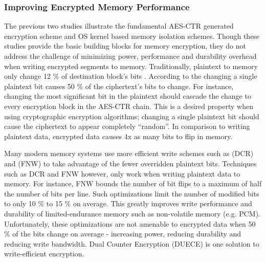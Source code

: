 \subsubsection{Improving Encrypted Memory Performance}
The previous two studies \cite{suh-memIntEnc} \cite{aegis} illustrate the
fundamental AES-CTR generated  encryption scheme and OS kernel based
memory isolation schemes. Though these studies provide the basic building
blocks for memory encryption, they do not address the challenge of minimizing
power, performance and durability overhead when writing encrypted segments to
memory. Traditionally, plaintext  to memory only change 12 \% of
destination block's  bits \cite{duece}. According to the 
\cite{avalance} changing a single plaintext bit causes 50 \% of the
ciphertext's bits to change. For instance, changing the most significant bit in
the plaintext should cascade the change to every encryption block in the
AES-CTR chain. This is a desired property when using cryptographic encryption
algorithms; changing a single plaintext bit should cause the ciphertext to
appear completely ``random''. In comparison to writing plaintext data,
encrypted data causes 4x as many bits to flip in memory.

Many modern memory systems use more efficient write schemes such as  (DCR) \cite{dcr} and  \cite{fnw} (FNW) to
take advantage of the fewer overridden plaintext bits. Techniques such as DCR
and FNW however, only work when writing plaintext data to memory. For instance,
FNW bounds the number of bit flips to a maximum of half the number of bits per
line. Such optimizations limit the number of modified bits to only 10 \% to 15
\% on average. This greatly improves write performance and durability of
limited-endurance memory such as non-volatile memory (e.g. PCM). Unfortunately,
these optimizations are not amenable to encrypted data when 50 \% of the bits
change on average - increasing power, reducing durability and reducing write
bandwidth. Dual Counter Encryption (DUECE) \cite{duece} is one solution to
write-efficient encryption.

